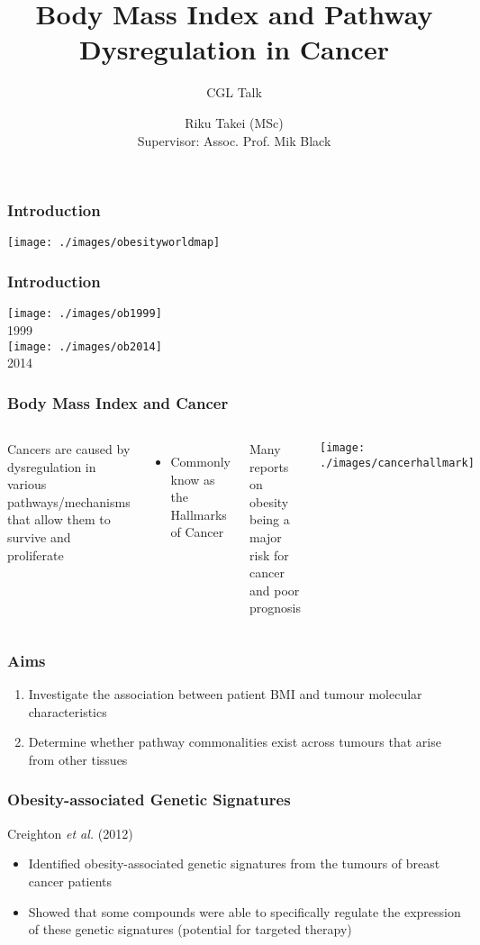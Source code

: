 \documentclass[handout]{beamer}
\title[BMI and Cancer]{Body Mass Index and Pathway Dysregulation in Cancer}
\subtitle{CGL Talk}
\author[Riku Takei]{Riku Takei (MSc)\\Supervisor: Assoc. Prof. Mik Black}
\institute{Department of Biochemistry, University of Otago}
\begin{document}
{
	\begin{frame}[noframenumbering]
		\titlepage
	\end{frame}
}

\begin{frame}
	\frametitle{Introduction}
	\begin{center}
		\texttt{[image: ./images/obesityworldmap]}
	\end{center}
\end{frame}

\begin{frame}
	\frametitle{Introduction}
	\begin{center}
		\texttt{[image: ./images/ob1999]}\\
		1999\\
		\texttt{[image: ./images/ob2014]}\\
		2014
	\end{center}
\end{frame}

\begin{frame}
	\frametitle{Body Mass Index and Cancer}
	\begin{columns}
		{\footnotesize
			Cancers are caused by dysregulation in various pathways/mechanisms that allow them to survive and proliferate
			\begin{itemize}
				\item Commonly know as the Hallmarks of Cancer
			\end{itemize}
			Many reports on obesity being a major risk for cancer and poor prognosis
		}
		\texttt{[image: ./images/cancerhallmark]}
	\end{columns}
\end{frame}

\begin{frame}
	\frametitle{Aims}
	\begin{enumerate}
		\item Investigate the association between patient BMI and tumour molecular characteristics
		\item Determine whether pathway commonalities exist across tumours that arise from other tissues
	\end{enumerate}
\end{frame}

\begin{frame}
	\frametitle{Obesity-associated Genetic Signatures}
	Creighton \textit{et al.} (2012)
	\begin{itemize}
		\item Identified obesity-associated genetic signatures from the tumours of breast cancer patients
		\item Showed that some compounds were able to specifically regulate the expression of these genetic signatures (potential for targeted therapy)
	\end{itemize}
\end{frame}
\end{document}
